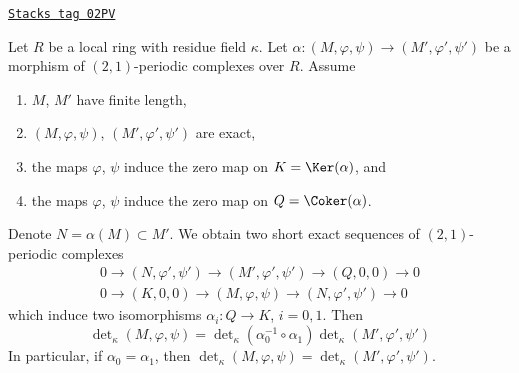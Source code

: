 \begin{lemma}[Tricky]
\label{chow-lemma-tricky}
\href{https://stacks.math.columbia.edu/tag/02PV}{\texttt{Stacks tag 02PV}}

Let $R$ be a local ring with residue field $\kappa$.
Let $\alpha : (M, \varphi, \psi) \to (M', \varphi', \psi')$
be a morphism of $(2, 1)$-periodic complexes over $R$.
Assume
\begin{enumerate}
\item $M$, $M'$ have finite length,
\item $(M, \varphi, \psi)$, $(M', \varphi', \psi')$ are exact,
\item the maps $\varphi$, $\psi$ induce the zero map on
$K = \Ker(\alpha)$, and
\item the maps $\varphi$, $\psi$ induce the zero map on
$Q = \Coker(\alpha)$.
\end{enumerate}
Denote $N = \alpha(M) \subset M'$. We obtain two short exact sequences
of $(2, 1)$-periodic complexes
$$
\begin{matrix}
0 \to (N, \varphi', \psi') \to (M', \varphi', \psi') \to (Q, 0, 0) \to 0 \\
0 \to (K, 0, 0) \to (M, \varphi, \psi) \to (N, \varphi', \psi') \to 0
\end{matrix}
$$
which induce two isomorphisms $\alpha_i : Q \to K$, $i = 0, 1$. Then
$$
\det\nolimits_\kappa(M, \varphi, \psi)
=
\det\nolimits_\kappa(\alpha_0^{-1} \circ \alpha_1)
\det\nolimits_\kappa(M', \varphi', \psi')
$$
In particular, if $\alpha_0 = \alpha_1$, then
$\det\nolimits_\kappa(M, \varphi, \psi) =
\det\nolimits_\kappa(M', \varphi', \psi')$.
\end{lemma}

